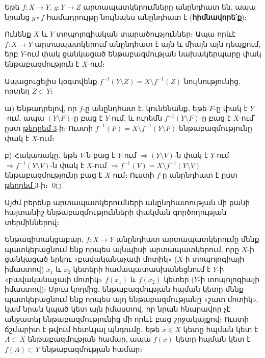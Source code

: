 \documentclass[./main.tex]{subfiles}
\begin{document}
\begin{hetevanq_counter}\label{ch9cor3} 
Եթե $f:X  \rightarrow  Y$, $g:Y  \rightarrow  Z$ արտապատկերումները անընդհատ են, ապա նրանց $g\circ f$ համադրույթը նույնպես անընդհատ է (\textbf{հիմնավորե՛ք})։
\end{hetevanq_counter}

\begin{theorem}\label{ch9thm4} \label{թեորեմ $4$}
Ունենք $X$ և $Y$ տոպոլոգիական տարածություններ։ Ապա որևէ ${f:X  \rightarrow  Y}$ արտապատկե\-րում անընդհատ է այն և միայն այն դեպքում, երբ $Y$-ում փակ ցան\-կա\-ցած ենթա\-բազ\-մութ\-յան նախակերպարը փակ ենթաբազմություն է $X$-ում։
\end{theorem}

\par Ապացուցելիս կօգտվենք ${f^{-1} (Y \setminus Z)=X \setminus f^{-1}} (Z)$ նույնությունից, որտեղ ${Z\subset Y}$։
\par ա) Ենթադրելով, որ $f$-ը անընդհատ է, կունենանք․ եթե $F$-ը փակ է $Y$-ում, ապա $(Y\setminus F)$-ը բաց է $Y$-ում, և ուրեմն $f^{-1} (Y  \setminus F)$-ը բաց է $X$-ում՝ ըստ \hyperref[ch9thm3]{թեորեմ 3}-ի։ Ուստի $f^{-1}(F)=X  \setminus f^{-1}(Y  \setminus F)$ ենթաբազմությունը փակ է $X$-ում։
\par բ) Հակառակը․ եթե $V$-ն բաց է $Y$-ում $ \Rightarrow  (Y  \setminus V)$-ն փակ է $Y$-ում $  \Rightarrow  f^{-1} (Y  \setminus V)$-ն փակ է $X$-ում $  \Rightarrow  f^{-1} (V)=X  \setminus f^{-1} (Y  \setminus V)$ ենթաբազմությունը բաց է $X$-ում։ Ուստի $f$-ը անընդհատ է ըստ \hyperref[թեորեմ $3$]{թեորեմ $3$}-ի։ \qed

\par Այժմ բերենք արտապատկերումների անընդհատության մի քանի հայտանիշ \linebreak ենթաբազմությունների փակման գործողության տերմիններով։
\par Ենթագիտակցաբար, $f:X \rightarrow Y$ անընդհատ արտապատկերումը մենք պատկե\-րացնում ենք որպես այնպիսի արտապատկերում, որը $X$-ի ցանկացած երկու «բա\-վա\-կա\-նաչափ մոտիկ» ($X$-ի տոպոլոգիայի իմաստով) $x_1$ և $x_2$ կետերի համա\-պա\-տաս\-խա\-նեցնում է $Y$-ի «բա\-վականաչափ մոտիկ» $f(x_1)$ և $f(x_2)$ կետեր ($Y$-ի տո\-պո\-լոգիայի իմաստով)։ Մյուս կողմից, ենթաբազմության հպման կետը մենք պատ\-կե\-րաց\-նում ենք որպես այդ ենթաբազմությանը «շատ մոտիկ», կամ նրան կպած կետ այն իմաստով, որ նրան հնարավոր չէ անջատել ենթաբազմությունից մի որևէ բաց շրջակայքով։ Ուստի ճշմարիտ է թվում հետևյալ պնդումը․ եթե $x \in X$ կետը հպման կետ է $A\subset X$ ենթաբազմության համար, ապա $f(x)$ կետը հպման կետ է $f(A)\subset Y$ ենթաբազմության համար։
\end{document}
